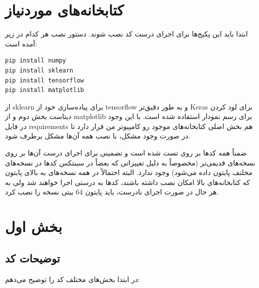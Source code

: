 \documentclass[12pt,titlepage,a4page , tikz , multi,table , svgnames,xcdraw]{article}
\begin{document}
\newpage



\section{کتابخانه‌های موردنیاز}

ابتدا باید این پکیج‌ها برای اجرای درست کد نصب شوند. دستور نصب هر کدام در زیر آمده است:

\begin{latin}
\begin{lstlisting}[language=Python]
pip install numpy
pip install sklearn
pip install tensorflow
pip install matplotlib
\end{lstlisting}

\end{latin}
از sklearn برای پیاده‌سازی خود  از tensorflow و به طور دقیق‌تر Keras برای لود کردن دیتاست بخش دوم و از matplotlib برای رسم نمودار استفاده شده است. با این وجود در فایل requirements هم بخش اصلی کتابخانه‌های موجود رو کامپیوتر من قرار دارد تا در صورت وجود مشکل، با نصب همه آن‌ها مشکل برطرف شود.

ضمناً همه کدها بر روی  تست شده است و تضمینی برای اجرای درست آن‌ها بر روی نسخه‌های قدیمی‌تر (مخصوصاً به دلیل تغییراتی که بعضاً در سینتکس کدها در نسخه‌های مخلتف پایتون داده می‌شود) وجود ندارد. البته احتمالاً در همه نسخه‌های  به بالای پایتون که کتابخانه‌های بالا امکان نصب داشته باشند، کدها به درستی اجرا خواهند شد ولی به هر حال در صورت اجرای نادرست، باید پایتون 64 بیتی نسخه  را نصب کرد.




\newpage

\section{بخش اول}

\subsection{توضیحات کد}
در ابتدا بخش‌های مختلف کد را توضیح می‌دهم:
\end{document}
